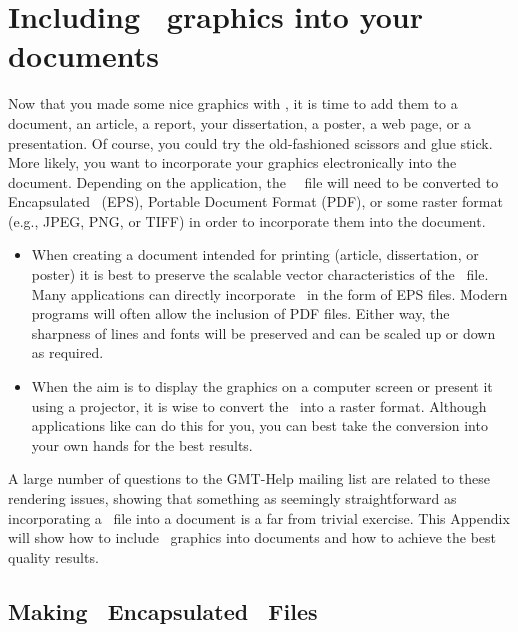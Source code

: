 %
%

\chapter{Including \gmt\ graphics into your documents}
\label{app:C}

Now that you made some nice graphics with \GMT, it is time to add them to a document, an article, a report, your dissertation, a poster, a web page, or a presentation. Of course, you could try the old-fashioned scissors and glue stick. More likely, you want to incorporate your graphics electronically into the document. Depending on the application, the \GMT\ \PS\ file will need to be converted to Encapsulated \PS\ (EPS), Portable Document Format (PDF), or some raster format (e.g., JPEG, PNG, or TIFF) in order to incorporate them into the document.
\begin{itemize}
\item When creating a document intended for printing (article, dissertation, or poster) it is best to preserve the scalable vector characteristics of the \PS\ file. Many applications can directly incorporate \PS\ in the form of EPS files. Modern programs will often allow the inclusion of PDF files. Either way, the sharpness of lines and fonts will be preserved and can be scaled up or down as required.
\item When the aim is to display the graphics on a computer screen or present it using a projector, it is wise to convert the \PS\ into a raster format. Although applications like  can do this for you, you can best take the conversion into your own hands for the best results.
\end{itemize}
A large number of questions to the GMT-Help mailing list are related to these rendering issues, showing that something as seemingly straightforward as incorporating a \PS\ file into a document is a far from trivial exercise.
This Appendix will show how to include \GMT\ graphics into documents and how to achieve the best quality results.

\section{Making \gmt\ Encapsulated \PS\ Files}
\label{sec:eps}

